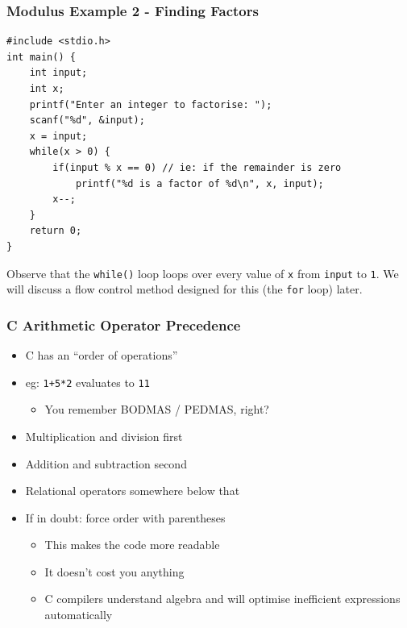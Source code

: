 \documentclass[14pt]{beamer}
\begin{document}
\begin{frame}[fragile]
\frametitle{Modulus Example 2 - Finding Factors}

\begin{lstlisting}[style=CStyle,basicstyle=\ttfamily\scriptsize]
#include <stdio.h>
int main() {
	int input;
	int x;
	printf("Enter an integer to factorise: ");
	scanf("%d", &input);
	x = input;
	while(x > 0) {
		if(input % x == 0) // ie: if the remainder is zero
			printf("%d is a factor of %d\n", x, input);
		x--;
	}
	return 0;
}
\end{lstlisting}
{\small
Observe that the \texttt{while()} loop loops over every value of \texttt{x} from \texttt{input} to \texttt{1}. We will discuss a flow control method designed for this (the \texttt{for} loop) later.
}
\end{frame}

\begin{frame}
\frametitle{C Arithmetic Operator Precedence}
\begin{itemize}
\item C has an ``order of operations''
\item eg: \texttt{1+5*2} evaluates to \texttt{11}
	\begin{itemize}
		\item You remember BODMAS / PEDMAS, right?
	\end{itemize}
\item Multiplication and division first
\item Addition and subtraction second
\item Relational operators somewhere below that
\item If in doubt: force order with parentheses
	\begin{itemize}
		\item This makes the code more readable
		\item It doesn't cost you anything
		\item C compilers understand algebra and will optimise inefficient expressions automatically
	\end{itemize}

\end{itemize}
\end{frame}
\end{document}
